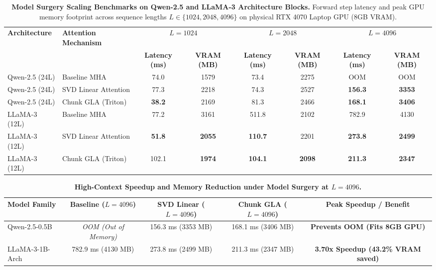 \documentclass[journal]{IEEEtran}
\begin{document}
\begin{table}[t]
\centering
\small
\caption{\textbf{Model Surgery Scaling Benchmarks on Qwen-2.5 and LLaMA-3 Architecture Blocks.} Forward step latency and peak GPU memory footprint across sequence lengths $L \in \{1024, 2048, 4096\}$ on physical RTX 4070 Laptop GPU (8GB VRAM).}
\label{tab:qwen_llama_surgery}
\begin{tabular}{llcccccc}
\toprule
\textbf{Architecture} & \textbf{Attention Mechanism} & \multicolumn{2}{c}{$L=1024$} & \multicolumn{2}{c}{$L=2048$} & \multicolumn{2}{c}{$L=4096$} \\
\cmidrule(lr){3-4} \cmidrule(lr){5-6} \cmidrule(lr){7-8}
 & & \textbf{Latency (ms)} & \textbf{VRAM (MB)} & \textbf{Latency (ms)} & \textbf{VRAM (MB)} & \textbf{Latency (ms)} & \textbf{VRAM (MB)} \\
\midrule
Qwen-2.5 (24L) & Baseline MHA & 74.0 & 1579 & 73.4 & 2275 & OOM & OOM \\
Qwen-2.5 (24L) & SVD Linear Attention & 77.3 & 2218 & 74.3 & 2527 & \textbf{156.3} & \textbf{3353} \\
Qwen-2.5 (24L) & Chunk GLA (Triton) & \textbf{38.2} & 2169 & 81.3 & 2466 & \textbf{168.1} & \textbf{3406} \\
\midrule
LLaMA-3 (12L) & Baseline MHA & 77.2 & 3161 & 511.8 & 2102 & 782.9 & 4130 \\
LLaMA-3 (12L) & SVD Linear Attention & \textbf{51.8} & \textbf{2055} & \textbf{110.7} & 2201 & \textbf{273.8} & \textbf{2499} \\
LLaMA-3 (12L) & Chunk GLA (Triton) & 102.1 & \textbf{1974} & \textbf{104.1} & \textbf{2098} & \textbf{211.3} & \textbf{2347} \\
\bottomrule
\end{tabular}
\end{table}

\begin{table}[h]
\centering
\small
\caption{\textbf{High-Context Speedup and Memory Reduction under Model Surgery at $L=4096$.}}
\label{tab:qwen_llama_highlights}
\begin{tabular}{lcccc}
\toprule
\textbf{Model Family} & \textbf{Baseline ($L=4096$)} & \textbf{SVD Linear ($L=4096$)} & \textbf{Chunk GLA ($L=4096$)} & \textbf{Peak Speedup / Benefit} \\
\midrule
Qwen-2.5-0.5B & \textit{OOM (Out of Memory)} & 156.3 ms (3353 MB) & 168.1 ms (3406 MB) & \textbf{Prevents OOM (Fits 8GB GPU)} \\
LLaMA-3-1B-Arch & 782.9 ms (4130 MB) & 273.8 ms (2499 MB) & 211.3 ms (2347 MB) & \textbf{3.70x Speedup (43.2\% VRAM saved)} \\
\bottomrule
\end{tabular}
\end{table}
\end{document}
